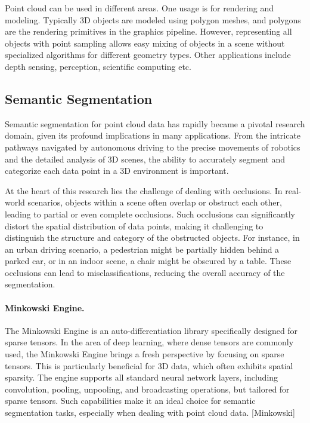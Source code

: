\documentclass[11pt, a4paper,oneside,chapterprefix=false]{scrbook}
\begin{document}
Point cloud can be used in different areas. One usage is for rendering and modeling. Typically 3D objects are modeled using polygon meshes, and  polygons are the rendering primitives in the graphics pipeline. However, representing all objects with point sampling allows easy mixing of objects in a scene without specialized algorithms for different geometry types. Other applications include depth sensing, perception, scientific computing etc.

\subsection{Semantic Segmentation}

Semantic segmentation for point cloud data has rapidly became a pivotal research domain, given its profound implications in many applications. From the intricate pathways navigated by autonomous driving to the precise movements of robotics and the detailed analysis of 3D scenes, the ability to accurately segment and categorize each data point in a 3D environment is important.

\vspace{10pt}

At the heart of this research lies the challenge of dealing with occlusions. In real-world scenarios, objects within a scene often overlap or obstruct each other, leading to partial or even complete occlusions. Such occlusions can significantly distort the spatial distribution of data points, making it challenging to distinguish the structure and category of the obstructed objects. For instance, in an urban driving scenario, a pedestrian might be partially hidden behind a parked car, or in an indoor scene, a chair might be obscured by a table. These occlusions can lead to misclassifications, reducing the overall accuracy of the segmentation.


\paragraph{Minkowski Engine.}

The Minkowski Engine \cite{CGS:19} is an auto-differentiation library specifically designed for sparse tensors. In the area of deep learning, where dense tensors are commonly used, the Minkowski Engine brings a fresh perspective by focusing on sparse tensors. This is particularly beneficial for 3D data, which often exhibits spatial sparsity. The engine supports all standard neural network layers, including convolution, pooling, unpooling, and broadcasting operations, but tailored for sparse tensors. Such capabilities make it an ideal choice for semantic segmentation tasks, especially when dealing with point cloud data. [Minkowski]
\end{document}
